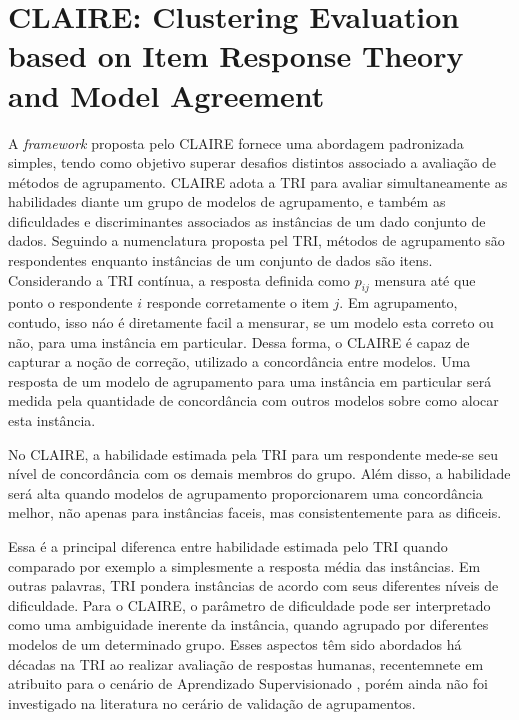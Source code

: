 \chapter{\gls{CLAIRE}: Clustering Evaluation based on Item Response Theory and Model Agreement}\label{chap:n4_claire}


A \textit{framework} proposta pelo \gls{CLAIRE} \cite{ferreira2025claire} fornece uma abordagem padronizada simples, tendo como objetivo superar desafios distintos associado a avaliação de métodos de agrupamento. \gls{CLAIRE} adota a \gls{TRI} para avaliar simultaneamente as habilidades diante um grupo de modelos de agrupamento, e também as dificuldades e discriminantes associados as instâncias de um dado conjunto de dados. Seguindo a numenclatura proposta pel \gls{TRI}, métodos de agrupamento são respondentes enquanto instâncias de um conjunto de dados são itens. Considerando a \gls{TRI} contínua, a resposta definida como $p_{ij}$ mensura até que ponto o respondente $i$ responde corretamente o item $j$. Em agrupamento, contudo, isso náo é diretamente facil a mensurar, se um modelo esta correto ou não, para uma instância em particular. Dessa forma, o \gls{CLAIRE} é capaz de capturar  a noção de correção, utilizado a concordância entre modelos. Uma resposta de um modelo de agrupamento para uma instância em particular será medida pela quantidade de concordância com outros modelos sobre como alocar esta instância.

No \gls{CLAIRE}, a habilidade estimada pela \gls{TRI} para um respondente mede-se seu nível de concordância com os demais membros do grupo.
Além disso, a habilidade será alta quando  modelos de agrupamento proporcionarem uma concordância melhor, não apenas para instâncias faceis, mas consistentemente para as dificeis.

Essa é a principal diferenca entre habilidade estimada pelo \gls{TRI} quando comparado por exemplo a simplesmente a resposta média das instâncias. Em outras palavras, \gls{TRI} pondera instâncias de acordo com seus diferentes níveis de dificuldade. Para o \gls{CLAIRE}, o parâmetro de dificuldade pode ser interpretado como uma ambiguidade inerente da instância, quando agrupado por diferentes modelos de um determinado grupo. Esses aspectos têm sido abordados há décadas na \gls{TRI} ao realizar avaliação de respostas humanas, recentemnete em atribuito para o cenário de Aprendizado Supervisionado \cite{martinez:2019}, porém ainda não foi investigado na literatura no cerário de validação de agrupamentos.


